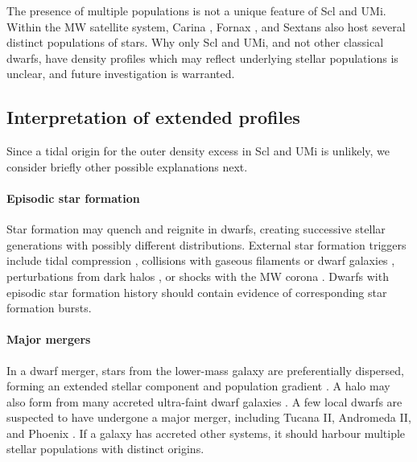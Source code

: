 \documentclass[linenumbers, twocolumn, twocolappendix]{aastex701}
\begin{document}
The presence of multiple populations is not a unique feature of Scl and UMi. 
Within the MW satellite system, Carina \citep[e.g.,][]{battaglia+2012},
Fornax \citep[e.g.,][]{battaglia+2006},
and Sextans \citep[e.g.,][]{battaglia+2011}
also host several distinct populations of stars.
Why only Scl and UMi, and not other classical dwarfs, have density profiles which may reflect underlying stellar populations is unclear, and future investigation is warranted.




\subsection{Interpretation of extended profiles} \label{sec:discussion}

Since a tidal origin for the outer density excess in Scl and UMi is unlikely, we consider briefly other possible explanations next.

\paragraph{Episodic star formation} 
Star formation may quench and reignite in dwarfs, creating successive stellar generations with possibly different distributions. 
External star formation triggers include 
tidal compression \citep{mayer+2001a, dong+lin+murray2003}, 
collisions with gaseous filaments or dwarf galaxies \citep{genina+2019},
perturbations from dark halos \citep{starkenburg+helmi+sales2016},
or shocks with the MW corona \citep{wright+2019}.
Dwarfs with episodic star formation history should contain evidence of corresponding star formation bursts.

\paragraph{Major mergers} 
In a dwarf merger, stars from the lower-mass galaxy are preferentially dispersed, forming an extended stellar component and population gradient \citep{benitez-llambay+2016, deason+2022}. 
A halo may also form from many accreted ultra-faint dwarf galaxies \citep{ricotti+polisensky+cleland2022}. 
A few local dwarfs are suspected to have undergone a major merger, including Tucana II, Andromeda II, and Phoenix \citep{lokas+2014, fouquet+2017, tarumi+yoshida+frebel2021, cardona-barrero+2021, querci+2025}.
If a galaxy has accreted other systems, it should harbour multiple stellar populations with distinct origins.
\end{document}
